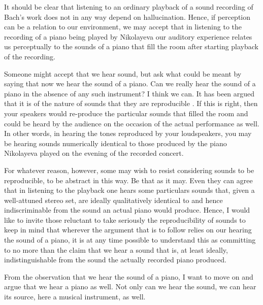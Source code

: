 \documentclass[sloppy, journal, git, bytitle, dodraft]{humapap}
\begin{document}
It should be clear that listening to an ordinary playback of a sound recording of Bach's work does not in any way depend on hallucination. Hence, if perception can be a relation to our environment, we may accept that in listening to the recording of a piano being played by Nikolayeva our auditory experience relates us perceptually to the sounds of a piano that fill the room after starting playback of the recording.

Someone might accept that we hear sound, but ask what could be meant by saying that now we hear the sound of a piano. Can we really hear the sound of a piano in the absence of any such instrument? I think we can. It has been argued that it is of the nature of sounds that they are reproducible \autocite{martin2012aa}. If this is right, then your speakers would re-produce the particular sounds that filled the room and could be heard by the audience on the occasion of the actual performance as well. In other words, in hearing the tones reproduced by your loudspeakers, you may be hearing sounds numerically identical to those produced by the piano Nikolayeva played on the evening of the recorded concert. 

For whatever reason, however, some may wish to resist considering sounds to be reproducible, to be abstract in this way. Be that as it may. Even they can agree that in listening to the playback one hears some particulars sounds that, given a well-attuned stereo set, are ideally qualitatively identical to and hence indiscriminable from the sound an actual piano would produce. Hence, I would like to invite those reluctant to take seriously the reproducibility of sounds to keep in mind that wherever the argument that is to follow relies on our hearing the sound of a piano, it is at any time possible to understand this as committing to no more than the claim that we hear a sound that is, at least ideally, indistinguishable from the sound the actually recorded piano produced. 


\sect From the observation that we hear the sound of a piano, I want to move on and argue that we hear a piano as well. Not only can we hear the sound, we can hear its source, here a musical instrument, as well. 
\end{document}
